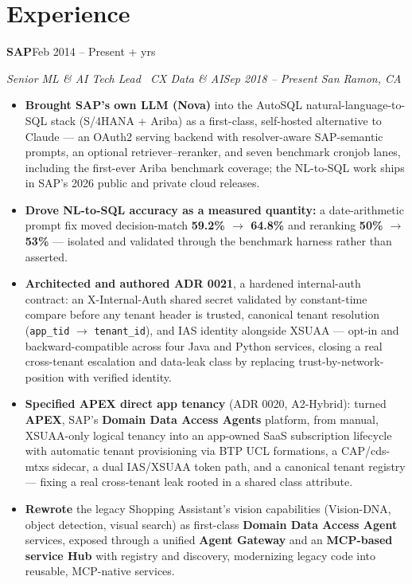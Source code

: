 \documentclass[11pt,letterpaper]{article}
\newcommand{\company}[2]{{\scshape\bfseries #1}\hfill #2\par\vspace{1pt}}
\newcommand{\role}[2]{{\itshape #1}\hfill{\itshape #2}\par\vspace{2pt}}
\begin{document}
\section{Experience}
\company{SAP}{Feb 2014 -- Present \;\textbullet{}+ yrs}
\role{Senior ML \& AI Tech Lead \textbar\ CX Data \& AI}{Sep 2018 -- Present \;\textbullet\; San Ramon, CA}
\begin{itemize}
  \item \textbf{Brought SAP's own LLM (Nova)} into the AutoSQL natural-language-to-SQL stack (S/4HANA
  + Ariba) as a first-class, self-hosted alternative to Claude --- an OAuth2 serving backend with
  resolver-aware SAP-semantic prompts, an optional retriever--reranker, and seven benchmark cronjob
  lanes, including the first-ever Ariba benchmark coverage; the NL-to-SQL work ships in SAP's 2026
  public and private cloud releases.
  \item \textbf{Drove NL-to-SQL accuracy as a measured quantity:} a date-arithmetic prompt fix moved
  decision-match \textbf{59.2\% $\rightarrow$ 64.8\%} and reranking \textbf{50\% $\rightarrow$ 53\%}
  --- isolated and validated through the benchmark harness rather than asserted.
  \item \textbf{Architected and authored ADR 0021}, a hardened internal-auth contract: an
  X-Internal-Auth shared secret validated by constant-time compare before any tenant header is trusted,
  canonical tenant resolution (\texttt{app\_tid} $\rightarrow$ \texttt{tenant\_id}), and IAS identity
  alongside XSUAA --- opt-in and backward-compatible across four Java and Python services, closing a
  real cross-tenant escalation and data-leak class by replacing trust-by-network-position with verified
  identity.
  \item \textbf{Specified APEX direct app tenancy} (ADR 0020, A2-Hybrid): turned \textbf{APEX}, SAP's
  \textbf{Domain Data Access Agents} platform, from manual, XSUAA-only logical tenancy into an app-owned
  SaaS subscription lifecycle with automatic tenant provisioning via BTP UCL formations, a CAP/cds-mtxs
  sidecar, a dual IAS/XSUAA token path, and a canonical tenant registry --- fixing a real cross-tenant
  leak rooted in a shared class attribute.
  \item \textbf{Rewrote} the legacy Shopping Assistant's vision capabilities (Vision-DNA, object
  detection, visual search) as first-class \textbf{Domain Data Access Agent} services, exposed through
  a unified \textbf{Agent Gateway} and an \textbf{MCP-based service Hub} with registry and discovery,
  modernizing legacy code into reusable, MCP-native services.

\end{itemize}
\end{document}
